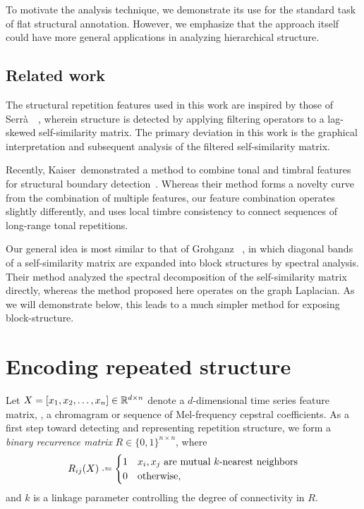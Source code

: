 \documentclass{article}
\begin{document}
To motivate the analysis technique, we demonstrate its use for the
standard task of flat structural annotation.  However, we emphasize that the approach
itself could have more general applications in analyzing hierarchical structure.

\subsection{Related work}

The structural repetition features used in this work are inspired by those of
Serr\`{a}~\etal~\cite{serra2012unsupervised}, wherein structure is detected by 
applying filtering operators to a lag-skewed self-similarity matrix.  The primary
deviation in this work is the graphical interpretation and subsequent analysis of 
the filtered self-similarity matrix.

Recently, Kaiser~\etal demonstrated a method to combine tonal and timbral features for
structural boundary detection~\cite{kaiser2013simple}.  Whereas their method forms a
novelty curve from the combination of multiple features, our feature combination
operates slightly differently, and uses local timbre consistency to connect sequences
of long-range tonal repetitions.

Our general idea is most similar to that of Grohganz \etal~\cite{grohganz2013converting},
in which diagonal bands of a self-similarity matrix are expanded into block structures
by spectral analysis.  Their method analyzed the spectral decomposition of the 
self-similarity matrix directly, whereas the method proposed here operates on the
graph Laplacian.  As we will demonstrate below, this leads to a much simpler method
for exposing block-structure.

\section{Encoding repeated structure}

Let $X = [x_1, x_2, \dots, x_n] \in \mathbb{R}^{d\times n}$ denote a $d$-dimensional time
series feature matrix, \eg, a chromagram or sequence of Mel-frequency cepstral 
coefficients.  As a first step toward detecting and representing repetition structure, 
we form a \emph{binary recurrence matrix} $R \in \{0,1\}^{n\times n}$, where 
\begin{equation}
R_{ij}(X) \defeq \begin{cases}
1 & x_i, x_j \text{ are mutual $k$-nearest neighbors}\\
0 & \text{otherwise},
\end{cases}
\end{equation}
and $k$ is a linkage parameter controlling the degree of connectivity in $R$.
\end{document}

